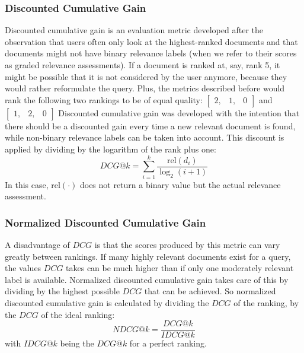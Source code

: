 \subsubsection{Discounted Cumulative Gain}
Discounted cumulative gain is an evaluation metric developed after the observation that users often only look at the highest-ranked documents and that documents might not have binary relevance labels (when we refer to their scores as graded relevance assessments).
If a document is ranked at, say, rank 5, it might be possible that it is not considered by the user anymore, because they would rather reformulate the query. Plus, the metrics described before would rank the following two rankings to be of equal quality: 
$\left[
\begin{smallmatrix}
	2, & 1, & 0
\end{smallmatrix}
\right]$ and $\left[
\begin{smallmatrix}
	1, & 2, & 0
\end{smallmatrix}
\right]$
Discounted cumulative gain was developed with the intention that there should be a discounted gain every time a new relevant document is found, while non-binary relevance labels can be taken into account. This discount is applied by dividing by the logarithm of the rank plus one: 
\begin{equation}
	\textit{DCG}@k = \sum^k_{i=1} \frac{\text{rel}(d_i)}{\log_2(i+1)}
\end{equation}
In this case, $\text{rel}(\cdot)$ does not return a binary value but the actual relevance assessment.

\subsubsection{Normalized Discounted Cumulative Gain}
A disadvantage of $\textit{DCG}$ is that the scores produced by this metric can vary greatly between rankings. If many highly relevant documents exist for a query, the values $\textit{DCG}$ takes can be much higher than if only one moderately relevant label is available. Normalized discounted cumulative gain takes care of this by dividing by the highest possible $\textit{DCG}$ that can be achieved. So normalized discounted cumulative gain is calculated by dividing the $\textit{DCG}$ of the ranking, by the $\textit{DCG}$ of the ideal ranking:  
\begin{equation}
	\textit{NDCG}@k = \frac{\textit{DCG}@k}{\textit{IDCG}@k} 
\end{equation}
with $\textit{IDCG}@k$ being the $\textit{DCG}@k$ for a perfect ranking. 

